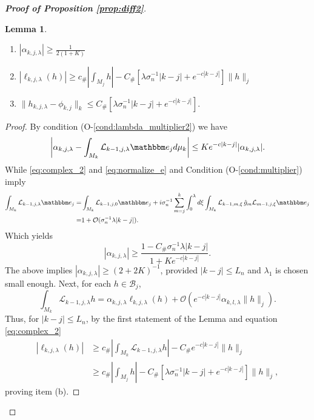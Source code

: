 \documentclass{amsart}
\numberwithin{equation}{section}
\newtheorem{lem}[thm]{Lemma}
\newcommand\cB{{\mathcal B}}
\newcommand\cL{{\mathcal L}}
\newcommand\cO{{\mathcal O}}
\newcommand{\bbe}{\mathbbm e}
\newcommand{\Const}{C_{\#}}
\newcommand{\const}{c_{\#}}
\begin{document}
\begin{proof}[\bf \em  Proof of Proposition \ref{prop:diff2}]
\begin{lem}
\begin{enumerate}
 \item[a)] $\displaystyle |\alpha_{k,j,\lambda}|\geq \frac{1}{2(1+K)}$
 \item[b)] $\displaystyle |\ell_{k,j,\lambda}(h)|\geq \const \left|\int_{M_j}h\right| -\Const \left[\lambda \sigma_n^{-1}|k-j|+ e^{-c|k-j|}\right]\|h\|_j$
  \item[c)] $\displaystyle \|h_{k,j,\lambda}-\phi_{k,j}\|_k\leq \Const\left[\lambda \sigma_n^{-1}|k-j|+ e^{-c|k-j|}\right].$
\end{enumerate}
\end{lem}
\begin{proof}
By condition  (O-\ref{cond:lambda_multiplier2}) we have
\[
 \left|\alpha_{k,j,\lambda}-\int_{M_k}\cL_{k-1,j,\lambda} \bbe_j d\mu_k\right|\leq K e^{-c|k-j|}|\alpha_{k,j,\lambda}|.
\]
While \eqref{eq:complex_2} and \eqref{eq:normalize_e} and Condition (O-\ref{cond:multiplier}) imply
\[
\begin{split}
\int_{M_k}\cL_{k-1,j,\lambda}\bbe_j=&\int_{M_k}\cL_{k-1,j,0}\bbe_j+i\sigma_n^{-1}\sum_{m=j}^k\int_0^\lambda d\xi \int_{M_k}\cL_{k-1,m,\xi}\,\hat g_m\cL_{m-1,j,\xi} \bbe_j\\
=& 1+\cO(\sigma_n^{-1}\lambda |k-j|).
\end{split}
\]
Which yields
\begin{equation}\label{eq:alpha_lower}
|\alpha_{k,j,\lambda}|\geq \frac{1-\Const \sigma_n^{-1}\lambda |k-j|}{1+Ke^{-c|k-j|}}.
\end{equation}
The above implies $|\alpha_{k,j,\lambda}|\geq(2+2K)^{-1}$, provided $|k-j|\leq L_n$ and $\lambda_1$ is chosen small enough.
Next, for each $h\in\cB_j$,
\[
\int_{M_k}\cL_{k-1,j,\lambda} h=\alpha_{k,j,\lambda}\ell_{k,j,\lambda}(h)+\cO(e^{-c|k-j|}\alpha_{k,l,\lambda}\|h\|_j).
\]
Thus, for $|k-j|\leq L_n$, by the first statement of the Lemma and equation \eqref{eq:complex_2} 
\begin{equation}
\label{eq:ell example}
\begin{split}
|\ell_{k,j,\lambda}(h)|&\geq \const\left|\int_{M_k}\cL_{k-1,j,\lambda} h\right|-\Const e^{-c|k-j|}\|h\|_j\\
&\geq \const \left|\int_{M_j}h\right| -\Const \left[\lambda \sigma_n^{-1}|k-j|+ e^{-c|k-j|}\right]\|h\|_j, 
\end{split}
\end{equation}
proving item (b).


\end{proof}
\end{proof}
\end{document}
